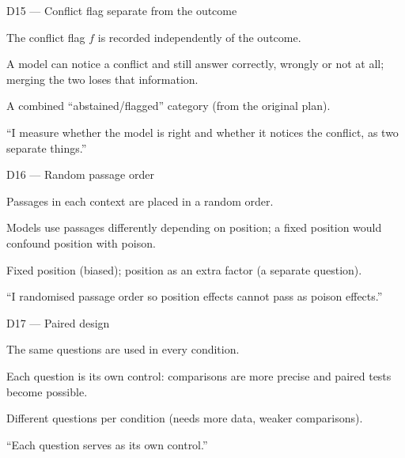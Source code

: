 \documentclass[11pt,a4paper]{report}
\begin{document}
\begin{decisionbox}{D15 --- Conflict flag separate from the outcome}
\begin{description}[nosep, leftmargin=0pt]
  \item[Decision.] The conflict flag $f$ is recorded independently of the
    outcome.
  \item[Why.] A model can notice a conflict and still answer correctly,
    wrongly or not at all; merging the two loses that information.
  \item[Alternatives.] A combined ``abstained/flagged'' category (from the
    original plan).
  \item[Interview line.] ``I measure whether the model is right and whether
    it notices the conflict, as two separate things.''
\end{description}
\end{decisionbox}

\begin{decisionbox}{D16 --- Random passage order}
\begin{description}[nosep, leftmargin=0pt]
  \item[Decision.] Passages in each context are placed in a random order.
  \item[Why.] Models use passages differently depending on position; a
    fixed position would confound position with poison.
  \item[Alternatives.] Fixed position (biased); position as an extra factor
    (a separate question).
  \item[Interview line.] ``I randomised passage order so position effects
    cannot pass as poison effects.''
\end{description}
\end{decisionbox}

\begin{decisionbox}{D17 --- Paired design}
\begin{description}[nosep, leftmargin=0pt]
  \item[Decision.] The same questions are used in every condition.
  \item[Why.] Each question is its own control: comparisons are more
    precise and paired tests become possible.
  \item[Alternatives.] Different questions per condition (needs more data,
    weaker comparisons).
  \item[Interview line.] ``Each question serves as its own control.''
\end{description}
\end{decisionbox}
\end{document}
